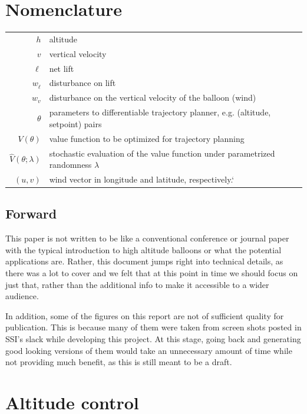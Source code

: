\documentclass[11pt]{scrartcl} %
\begin{document}
\newcommand{\cf}{{\it cf.}}
\newcommand{\eg}{{\it e.g.}}
\newcommand{\ie}{{\it i.e.}}
\newcommand{\etc}{{\it etc.}}

\tableofcontents

\section*{Nomenclature}
\begin{tabular}{rl}
$h$ & altitude  \\
$v$ & vertical velocity\\
$\ell$ & net lift \\
$w_{\dot \ell}$ & disturbance on lift \\
$w_{v}$ & disturbance on the vertical velocity of the balloon (wind) \\
$\theta$ & parameters to differentiable trajectory planner, e.g. (altitude, setpoint) pairs\\
$V(\theta)$ & value function to be optimized for trajectory planning \\
$\hat V(\theta; \lambda)$ & stochastic evaluation of the value function under parametrized randomness $\lambda$ \\
$(u,v)$ & wind vector in longitude and latitude, respectively.`
\end{tabular}

\subsection*{Forward}

This paper is not written to be like a conventional conference or journal paper with the typical introduction to high altitude balloons or what the potential applications are. Rather, this document jumps right into technical details, as there was a lot to cover and we felt that at this point in time we should focus on just that, rather than the additional info to make it accessible to a wider audience.

In addition, some of the figures on this report are not of sufficient quality for publication. This is because many of them were taken from screen shots posted in SSI's slack while developing this project. At this stage, going back and generating good looking versions of them would take an unnecessary amount of time while not providing much benefit, as this is still meant to be a draft. 


\section{Altitude control}
\end{document}
